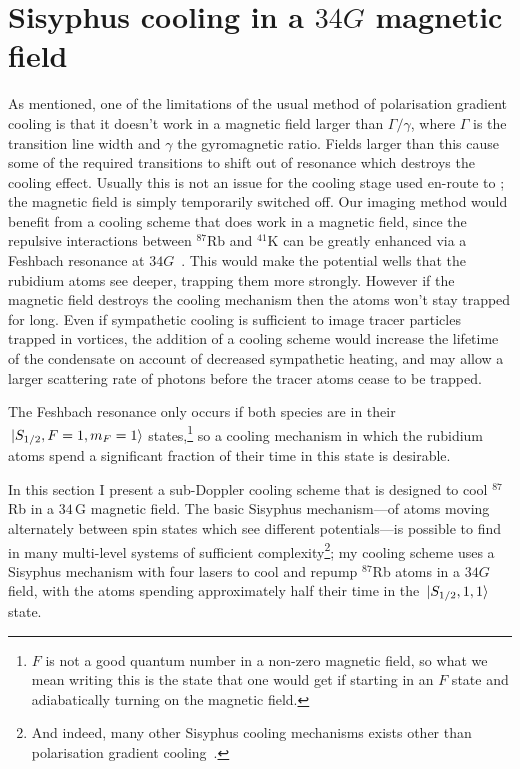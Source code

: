 \section{Sisyphus cooling in a $34\unit{G}$ magnetic field}\label{sec:laser_cooling_simulations}

As mentioned, one of the limitations of the usual method of polarisation gradient cooling is that it doesn't work in a magnetic field larger than $\Gamma/\gamma$, where $\Gamma$ is the transition line width and $\gamma$ the gyromagnetic ratio. Fields larger than this cause some of the required transitions to shift out of resonance which destroys the cooling effect. Usually this is not an issue for the cooling stage used en-route to \bec; the magnetic field is simply temporarily switched off. Our imaging method would benefit from a cooling scheme that does work in a magnetic field, since the repulsive interactions between $^{87}$Rb and $^{41}$K can be greatly enhanced via a Feshbach resonance at $34 \unit{G}$~\cite{thalhammer_double_2008}. This would make the potential wells that the rubidium atoms see deeper, trapping them more strongly. However if the magnetic field destroys the cooling mechanism then the atoms won't stay trapped for long. Even if sympathetic cooling is sufficient to image tracer particles trapped in vortices, the addition of a cooling scheme would increase the lifetime of the condensate on account of decreased sympathetic heating, and may allow a larger scattering rate of photons before the tracer atoms cease to be trapped.

The Feshbach resonance only occurs if both species are in their \mbox{$\ket{S_{1/2}, F=1,m_F=1}$} states,\footnote{$F$ is not a good quantum number in a non-zero magnetic field, so what we mean writing this is the state that one would get if starting in an $F$ state and adiabatically turning on the magnetic field.} so a cooling mechanism in which the rubidium atoms spend a significant fraction of their time in this state is desirable.

In this section I present a sub-Doppler cooling scheme that is designed to cool $^{87}$Rb in a $34\,$G magnetic field. The basic Sisyphus mechanism---of atoms moving alternately between spin states which see different potentials---is possible to find in many multi-level systems of sufficient complexity\footnote{And indeed, many other Sisyphus cooling mechanisms exists other than polarisation gradient cooling~\cite[p 116]{metcalf_laser_1999}.}; my cooling scheme uses a Sisyphus mechanism with four lasers to cool and repump $^{87}$Rb atoms in a $34\unit{G}$ field, with the atoms spending approximately half their time in the \mbox{$\ket{S_{1/2}, 1,1}$} state.

